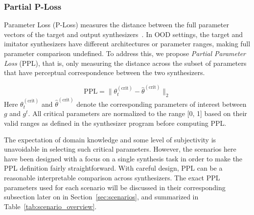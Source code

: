 \documentclass[10pt]{article} %
\begin{document}

\subsubsection{Partial P-Loss}
\label{sec:partial_ploss}
 Parameter Loss (P-Loss) measures the distance between the full parameter vectors of the target and output synthesizers~\cite{yee2018automatic}. In OOD settings, the target and imitator synthesizers have different architectures or parameter ranges, making full parameter comparison undefined. To address this, we propose \emph{Partial Parameter Loss} (PPL), that is, only measuring the distance across the subset of parameters that have perceptual correspondence between the two synthesizers.

\begin{equation}
\mathrm{PPL} = \| \theta^{(\mathrm{crit})}_t - \hat{\theta}^{(\mathrm{crit})} \|_2
\end{equation}
Here $\theta^{(\mathrm{crit})}_t$ and $\hat{\theta}^{(\mathrm{crit})}$ denote the corresponding parameters of interest between $g$ and $g^t$.  All critical parameters are normalized to the range [0, 1] based on their valid ranges as defined in the synthesizer program before computing PPL.

The expectation of domain knowledge and some level of subjectivity is unavoidable in selecting such critical parameters. However, the scenarios here have been designed with a focus on a single synthesis task in order to make the PPL definition fairly straightforward. With careful design, PPL can be a reasonable interpretable comparison across synthesizers. The exact PPL parameters used for each scenario will be discussed in their corresponding subsection later on in Section~\ref{sec:scenarios}, and summarized in Table~\ref{tab:scenario_overview}.
\end{document}
